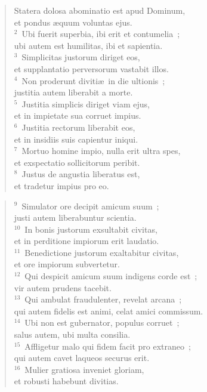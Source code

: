 \begin{flushleft}\begin{verse}\vspace{-19pt}\hspace{6pt}Statera dolosa abominatio est apud Dominum,\\\hspace{6pt} et pondus \ae quum voluntas ejus.\\
${}^{2}$~Ubi fuerit superbia, ibi erit et contumelia~;\\ ubi autem est humilitas, ibi et sapientia.\\
${}^{3}$~Simplicitas justorum diriget eos,\\ et supplantatio perversorum vastabit illos.\\
${}^{4}$~Non proderunt diviti\ae\ in die ultionis~;\\ justitia autem liberabit a morte.\\
${}^{5}$~Justitia simplicis diriget viam ejus,\\ et in impietate sua corruet impius.\\
${}^{6}$~Justitia rectorum liberabit eos,\\ et in insidiis suis capientur iniqui.\\
${}^{7}$~Mortuo homine impio, nulla erit ultra spes,\\ et exspectatio sollicitorum peribit.\\
${}^{8}$~Justus de angustia liberatus est,\\ et tradetur impius pro eo.\end{verse}\end{flushleft}


\begin{flushleft}\begin{verse}${}^{9}$~Simulator ore decipit amicum suum~;\\ justi autem liberabuntur scientia.\\
${}^{10}$~In bonis justorum exsultabit civitas,\\ et in perditione impiorum erit laudatio.\\
${}^{11}$~Benedictione justorum exaltabitur civitas,\\ et ore impiorum subvertetur.\\
${}^{12}$~Qui despicit amicum suum indigens corde est~;\\ vir autem prudens tacebit.\\
${}^{13}$~Qui ambulat fraudulenter, revelat arcana~;\\ qui autem fidelis est animi, celat amici commissum.\\
${}^{14}$~Ubi non est gubernator, populus corruet~;\\ salus autem, ubi multa consilia.\\
${}^{15}$~Affligetur malo qui fidem facit pro extraneo~;\\ qui autem cavet laqueos securus erit.\\
${}^{16}$~Mulier gratiosa inveniet gloriam,\\ et robusti habebunt divitias.\end{verse}\end{flushleft}


